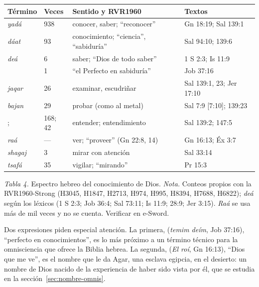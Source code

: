 \begin{center}\small\renewcommand{\arraystretch}{1.2}
\begin{tabular}{@{}L{3.2cm}L{1.1cm}L{6.0cm}L{4.1cm}@{}}
\toprule
\textbf{Término} & \textbf{Veces} & \textbf{Sentido y RVR1960} & \textbf{Textos} \\ \midrule
{} \emph{yadá} & 938 & conocer, saber; ``reconocer'' & Gn 18:19; Sal 139:1 \\
 \emph{dáat} & 93 & conocimiento; ``ciencia'', ``sabiduría'' & Sal 94:10; 139:6 \\
 \emph{deá} & 6 & saber; ``Dios de todo saber'' & 1 S 2:3; Is 11:9 \\
 & 1 & ``el Perfecto en sabiduría'' & Job 37:16 \\
 \emph{jaqar} & 26 & examinar, escudriñar & Sal 139:1, 23; Jer 17:10 \\
 \emph{bajan} & 29 & probar (como al metal) & Sal 7:9 [7:10]; 139:23 \\
;  & 168; 42 & entender; entendimiento & Sal 139:2; 147:5 \\
 \emph{raá} & --- & ver; ``proveer'' (Gn 22:8, 14) & Gn 16:13; Éx 3:7 \\
 \emph{shagaj} & 3 & mirar con atención & Sal 33:14 \\
 \emph{tsafá} & 35 & vigilar; ``mirando'' & Pr 15:3 \\
\bottomrule
\end{tabular}\par
{\footnotesize\color{gris}\textit{Tabla 4.} Espectro hebreo del conocimiento de Dios. \textit{Nota.} Conteos propios con la RVR1960-Strong (H3045, H1847, H2713, H974, H995, H8394, H7688, H6822); \emph{deá} según los léxicos (1 S 2:3; Job 36:4; Sal 73:11; Is 11:9; 28:9; Jer 3:15). \emph{Raá} se usa más de mil veces y no se cuenta. Verificar en e-Sword.}
\end{center}

Dos expresiones piden especial atención. La primera,  (\emph{temim deím}, Job 37:16), ``perfecto en conocimientos'', es lo más próximo a un término técnico para la omnisciencia que ofrece la Biblia hebrea. La segunda,  (\emph{El roí}, Gn 16:13), ``Dios que me ve'', es el nombre que le da Agar, una esclava egipcia, en el desierto: un nombre de Dios nacido de la experiencia de haber sido vista por él, que se estudia en la sección~\ref{sec:nombre-omnis}.

